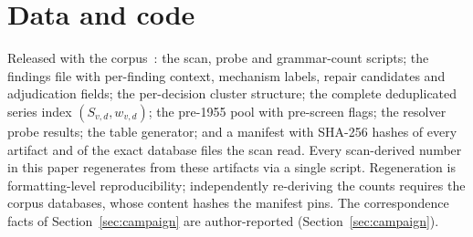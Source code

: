 \documentclass[11pt,a4paper]{article}
\begin{document}
\section{Data and code}\label{sec:release}

Released with the corpus~\citep{hertner2026opencaselaw}: the scan,
probe and grammar-count scripts; the findings file with per-finding
context, mechanism labels, repair candidates and adjudication fields;
the per-decision cluster structure; the complete deduplicated series
index $(S_{v,d}, w_{v,d})$; the pre-1955 pool with pre-screen flags;
the resolver probe results; the table generator; and a manifest with
SHA-256 hashes of every artifact and of the exact database files the
scan read. Every scan-derived number in this paper regenerates from
these artifacts via a single script. Regeneration is formatting-level
reproducibility; independently re-deriving the counts requires the
corpus databases, whose content hashes the manifest pins. The
correspondence facts of Section~\ref{sec:campaign} are author-reported
(Section~\ref{sec:campaign}).



\end{document}
